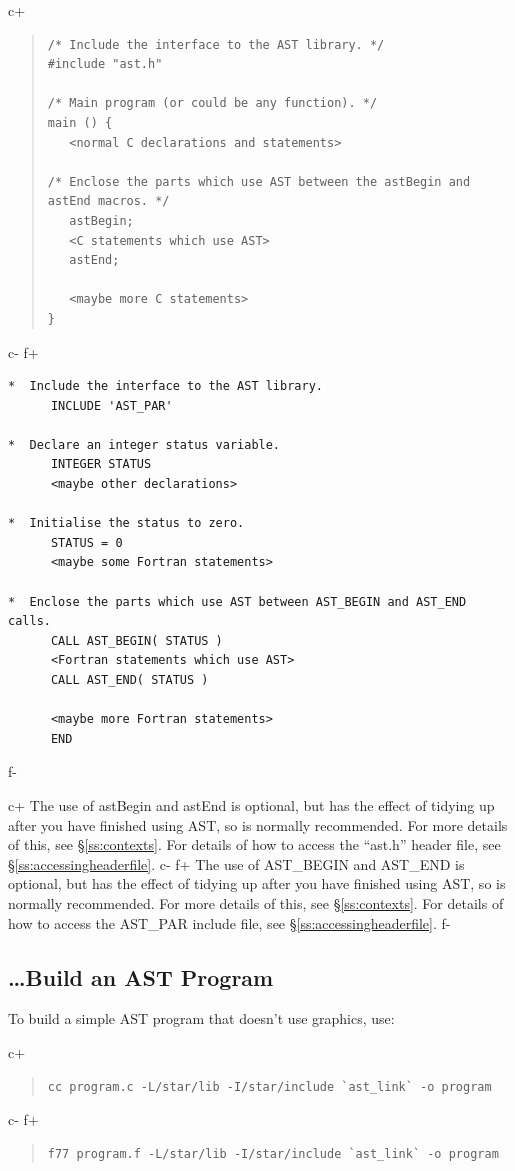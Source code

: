 \documentclass[twoside,11pt]{article}
\newcommand{\secref}[1]{\S\ref{#1}}
\newcommand{\secref}[1]{\ref{#1}}
\begin{document}
c+
\begin{quote}
\small
\begin{verbatim}
/* Include the interface to the AST library. */
#include "ast.h"

/* Main program (or could be any function). */
main () {
   <normal C declarations and statements>

/* Enclose the parts which use AST between the astBegin and astEnd macros. */
   astBegin;
   <C statements which use AST>
   astEnd;

   <maybe more C statements>
}
\end{verbatim}
\normalsize
\end{quote}
c-
f+
\small
\begin{verbatim}
*  Include the interface to the AST library.
      INCLUDE 'AST_PAR'

*  Declare an integer status variable.
      INTEGER STATUS
      <maybe other declarations>

*  Initialise the status to zero.
      STATUS = 0
      <maybe some Fortran statements>

*  Enclose the parts which use AST between AST_BEGIN and AST_END calls.
      CALL AST_BEGIN( STATUS )
      <Fortran statements which use AST>
      CALL AST_END( STATUS )

      <maybe more Fortran statements>
      END
\end{verbatim}
\normalsize
f-

c+
The use of astBegin and astEnd is optional, but has the effect of
tidying up after you have finished using AST, so is normally
recommended. For more details of this, see \secref{ss:contexts}. For
details of how to access the ``ast.h'' header file, see
\secref{ss:accessingheaderfile}.
c-
f+
The use of AST\_BEGIN and AST\_END is optional, but has the effect of
tidying up after you have finished using AST, so is normally
recommended. For more details of this, see \secref{ss:contexts}. For
details of how to access the AST\_PAR include file, see
\secref{ss:accessingheaderfile}.
f-

\subsection{\label{ss:howtobuild}\ldots Build an AST Program}

To build a simple AST program that doesn't use graphics, use:

c+
\begin{quote}
\small
\begin{verbatim}
cc program.c -L/star/lib -I/star/include `ast_link` -o program
\end{verbatim}
\normalsize
\end{quote}
c-
f+
\begin{quote}
\small
\begin{verbatim}
f77 program.f -L/star/lib -I/star/include `ast_link` -o program
\end{verbatim}
\normalsize
\end{quote}
\end{document}
